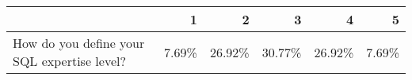 \begin{table}[tb]
\begin{tabular}{@{}C{4cm}rrrrr@{}}
                                                                  & \textbf{1}                                 & \textbf{2}                                         & \textbf{3}                                          & \textbf{4}                                     & \textbf{5}                                           \\ \midrule
  How do you define your SQL expertise level?                     & 7.69\%                                    & 26.92\%                                             & 30.77\%                                             & 26.92\%                                        & 7.69\%                                               \\ \bottomrule
  \end{tabular}
  \end{table}


